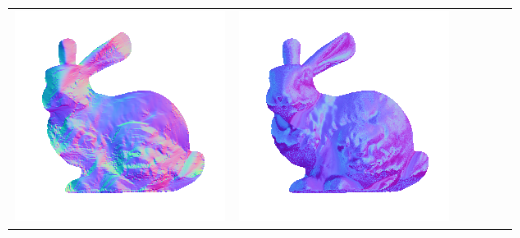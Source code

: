 \begin{center}
\begin{tabularx}{\linewidth}{@{}Y@{}Y@{}Y@{}Y@{}Y@{}Y@{}}
\includegraphics[width=\linewidth]{semisynthetic/20160617_14_yu_out.png} &
\includegraphics[width=\linewidth]{semisynthetic/20160617_14_dpsn_out.png} &

\end{tabularx}
\end{center}
